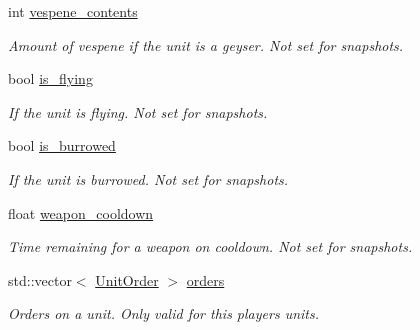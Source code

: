 \begin{DoxyCompactItemize}
\mbox{\label{classsc2_1_1_unit_a76fcaa010a8a61b14b2839f49ef0f257}} 
int \hyperlink{classsc2_1_1_unit_a76fcaa010a8a61b14b2839f49ef0f257}{vespene\+\_\+contents}
\begin{DoxyCompactList}\small\item\em Amount of vespene if the unit is a geyser. Not set for snapshots. \end{DoxyCompactList}\item 
\mbox{\label{classsc2_1_1_unit_a6480f0b177f99a656ab3a273df3f8c3c}} 
bool \hyperlink{classsc2_1_1_unit_a6480f0b177f99a656ab3a273df3f8c3c}{is\+\_\+flying}
\begin{DoxyCompactList}\small\item\em If the unit is flying. Not set for snapshots. \end{DoxyCompactList}\item 
\mbox{\label{classsc2_1_1_unit_af815cd5269616209d4a2bdf2e734decb}} 
bool \hyperlink{classsc2_1_1_unit_af815cd5269616209d4a2bdf2e734decb}{is\+\_\+burrowed}
\begin{DoxyCompactList}\small\item\em If the unit is burrowed. Not set for snapshots. \end{DoxyCompactList}\item 
\mbox{\label{classsc2_1_1_unit_a09bcc532a373b225b4ddb16fa77e9c41}} 
float \hyperlink{classsc2_1_1_unit_a09bcc532a373b225b4ddb16fa77e9c41}{weapon\+\_\+cooldown}
\begin{DoxyCompactList}\small\item\em Time remaining for a weapon on cooldown. Not set for snapshots. \end{DoxyCompactList}\item 
\mbox{\label{classsc2_1_1_unit_a45b97cf510454a385c372e512b40c51a}} 
std\+::vector$<$ \hyperlink{structsc2_1_1_unit_order}{Unit\+Order} $>$ \hyperlink{classsc2_1_1_unit_a45b97cf510454a385c372e512b40c51a}{orders}
\begin{DoxyCompactList}\small\item\em Orders on a unit. Only valid for this player\textquotesingle{}s units. \end{DoxyCompactList}\item 
\mbox{\label{classsc2_1_1_unit_a01b13cf74f1851983a834fdbf3e22b8a}} 

\end{DoxyCompactItemize}
